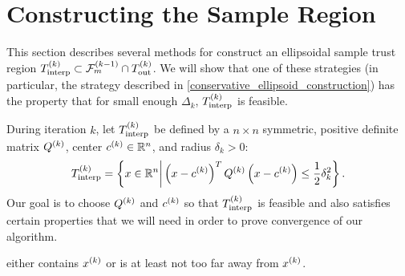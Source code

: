 \section{Constructing the Sample Region}
\label{possible_ellipsoids}
This section describes several methods for construct an ellipsoidal sample trust region ${T_{\text{interp}}^{(k)}} \subset {\mathcal F_m^{(k-1)}} \cap {T_{\text{out}}^{(k)}}$.   
We will show that one of these strategies (in particular, the strategy described in \cref{conservative_ellipsoid_construction}) has the property that 
for small enough $\Delta_k$,  ${T_{\text{interp}}^{(k)}}$ is feasible.    

During iteration $k$, let ${T_{\text{interp}}^{(k)}}$ be defined by a $n\times n$ symmetric, positive definite matrix ${Q^{(k)}}$, center ${c^{(k)}} \in \mathbb R^n$, and radius $\delta_{k} > 0$:
\begin{align}
{T_{\text{interp}}^{(k)}} = \left \{x \in \mathbb R^n \bigg | \left(x - {c^{(k)}}\right)^T {Q^{(k)}}\left(x - {c^{(k)}}\right) \le \frac 1 2 \delta_k^2 \right \}. \label{define_sampletrk}
\end{align}
Our goal is to choose ${Q^{(k)}}$ and ${c^{(k)}}$ so that ${T_{\text{interp}}^{(k)}}$ is  feasible and also satisfies certain properties that we will need in order to prove convergence of our algorithm.





either contains $x^{(k)}$ or is at least not too far away from $x^{(k)}$.  



%
%  
%





